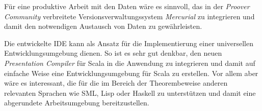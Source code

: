 Für eine produktive Arbeit mit den Daten wäre es sinnvoll, das in der \textit{Proover Community}
verbreitete Versionsverwaltungssystem \textit{Mercurial} zu integrieren und damit den notwendigen
Austausch von Daten zu gewährleisten.

Die entwickelte IDE kann als Ansatz für die Implementierung einer universellen Entwicklungsumgebung
dienen. So ist es sehr gut denkbar, den neuen \textit{Presentation Compiler} für Scala in die
Anwendung zu integrieren und damit auf einfache Weise eine Entwicklungsumgebung für Scala zu
erstellen. Vor allem aber wäre es interessant, die für die im Bereich der Theorembeweise anderen
relevanten Sprachen wie SML, Lisp oder Haskell zu unterstützen und damit eine abgerundete
Arbeitsumgebung bereitzustellen.